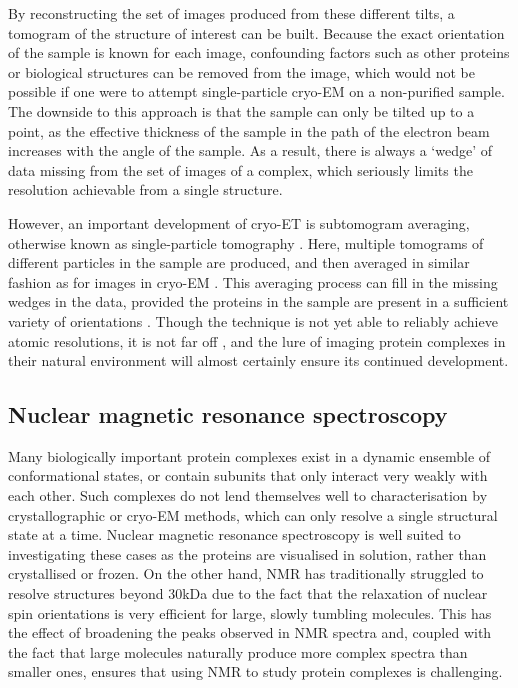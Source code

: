 \documentclass[a4paper,11pt,twoside,openright]{scrbook}
\begin{document}
By reconstructing the set of images produced from these different tilts, a tomogram of the structure of interest can be built. Because the exact orientation of the sample is known for each image, confounding factors such as other proteins or biological structures can be removed from the image, which would not be possible if one were to attempt single-particle cryo-EM on a non-purified sample. The downside to this approach is that the sample can only be tilted up to a point, as the effective thickness of the sample in the path of the electron beam increases with the angle of the sample. As a result, there is always a `wedge' of data missing from the set of images of a complex, which seriously limits the resolution achievable from a single structure.

However, an important development of cryo-ET is subtomogram averaging, otherwise known as single-particle tomography \cite{Galaz-Montoya2017}. Here, multiple tomograms of different particles in the sample are produced, and then averaged in similar fashion as for images in cryo-EM \cite{Bharat2016}. This averaging process can fill in the missing wedges in the data, provided the proteins in the sample are present in a sufficient variety of orientations \cite{Leschziner2006}. Though the technique is not yet able to reliably achieve atomic resolutions, it is not far off \cite{Schur2016}, and the lure of imaging protein complexes in their natural environment will almost certainly ensure its continued development.

\subsection{Nuclear magnetic resonance spectroscopy}
Many biologically important protein complexes exist in a dynamic ensemble of conformational states, or contain subunits that only interact very weakly with each other. Such complexes do not lend themselves well to characterisation by crystallographic or cryo-EM methods, which can only resolve a single structural state at a time. Nuclear magnetic resonance spectroscopy is well suited to investigating these cases as the proteins are visualised in solution, rather than crystallised or frozen. On the other hand, NMR has traditionally struggled to resolve structures beyond 30kDa due to the fact that the relaxation of nuclear spin orientations is very efficient for large, slowly tumbling molecules. This has the effect of broadening the peaks observed in NMR spectra and, coupled with the fact that large molecules naturally produce more complex spectra than smaller ones, ensures that using NMR to study protein complexes is challenging.
\end{document}
